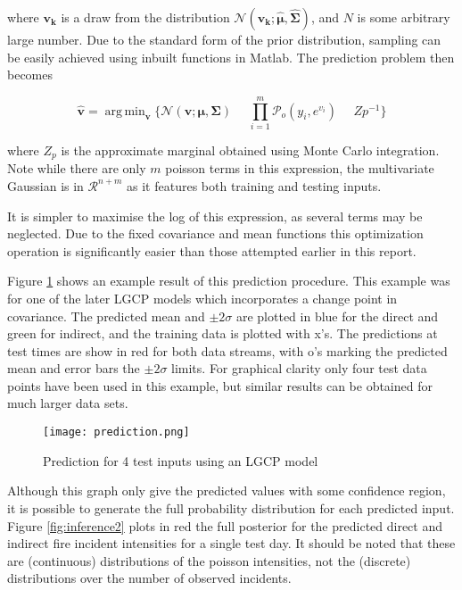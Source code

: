 \documentclass[a4paper,11pt]{report}
\DeclareMathOperator*{\argmin}{arg\,min}
\begin{document}
where \(\mathbf{v_k}\) is a draw from the distribution \(\mathcal{N}(\mathbf{v_k};\hat{\boldsymbol{\mu}},\hat{\boldsymbol{\Sigma}})\), and \(N\) is some arbitrary large number. Due to the standard form of the prior distribution, sampling can be easily achieved using inbuilt functions in Matlab. The prediction problem then becomes 

\begin{equation}
\hat{\mathbf{v}} = \argmin_\mathbf{v}{\{  \mathcal{N}(\mathbf{v};\boldsymbol{\mu, \Sigma}) \text{  }\text{  } \displaystyle \prod_{i=1}^{m} \mathcal{P}_o (y_i, e^{v_i}) \text{  }\text{  } Zp^{-1} } \}
\end{equation}

where \(Z_p\) is the approximate marginal obtained using Monte Carlo integration. Note while there are only \(m\) poisson terms in this expression, the multivariate Gaussian is in \(\mathcal{R}^{n+m}\) as it features both training and testing inputs. \par

It is simpler to maximise the log of this expression, as several terms may be neglected. Due to the fixed covariance and mean functions this optimization operation is significantly easier than those attempted earlier in this report. \par

Figure \ref{fig:inference} shows an example result of this prediction procedure. This example was for one of the later LGCP models which incorporates a change point in covariance. The predicted mean and \(\pm 2 \sigma\) are plotted in blue for the direct and green for indirect, and the training data is plotted with x's. The predictions at test times are show in red for both data streams, with o's marking the predicted mean and error bars the \(\pm 2 \sigma\) limits. For graphical clarity only four test data points have been used in this example, but similar results can be obtained for much larger data sets.

\begin{figure}[h!]
\centering
\texttt{[image: prediction.png]}
\caption{Prediction for 4 test inputs using an LGCP model}
\label{fig:inference}
\end{figure}

Although this graph only give the predicted values with some confidence region, it is possible to generate the full probability distribution for each predicted input. Figure \ref{fig:inference2} plots in red the full posterior for the predicted direct and indirect fire incident intensities for a single test day. It should be noted that these are (continuous) distributions of the poisson intensities, not the (discrete) distributions over the number of observed incidents. 
\end{document}
